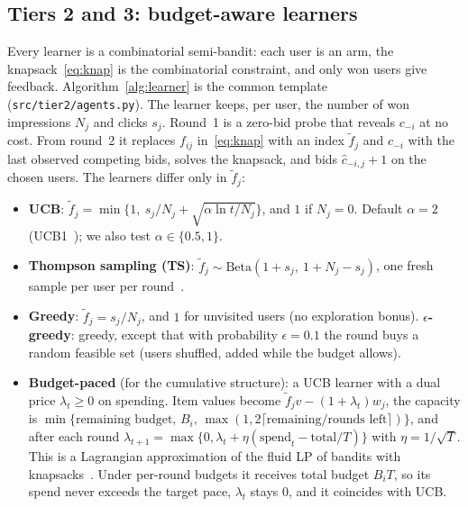 \documentclass{article}
\theoremstyle{definition}
\begin{document}
\subsection{Tiers 2 and 3: budget-aware learners}\label{sec:learners}
Every learner is a combinatorial semi-bandit: each user is an arm, the knapsack~\eqref{eq:knap} is the
combinatorial constraint, and only won users give feedback. Algorithm~\ref{alg:learner} is the common
template (\texttt{src/tier2/agents.py}). The learner keeps, per user, the number of won impressions $N_j$
and clicks $s_j$. Round~1 is a zero-bid probe that reveals $c_{-i}$ at no cost. From round~2 it replaces
$f_{ij}$ in~\eqref{eq:knap} with an index $\tilde f_j$ and $c_{-i}$ with the last observed competing bids,
solves the knapsack, and bids $\hat c_{-i,j}+1$ on the chosen users. The learners differ only in
$\tilde f_j$:
\begin{itemize}
  \item \textbf{UCB}: $\tilde f_j=\min\{1,\ s_j/N_j+\sqrt{\alpha\ln t/N_j}\}$, and $1$ if $N_j=0$. Default
        $\alpha=2$ (UCB1~\citep{auer2002finite}); we also test $\alpha\in\{0.5,1\}$.
  \item \textbf{Thompson sampling (TS)}: $\tilde f_j\sim\mathrm{Beta}(1+s_j,\ 1+N_j-s_j)$, one fresh
        sample per user per round~\citep{thompson1933likelihood,agrawal2012analysis}.
  \item \textbf{Greedy}: $\tilde f_j=s_j/N_j$, and $1$ for unvisited users (no exploration bonus).
        \textbf{$\epsilon$-greedy}: greedy, except that with probability $\epsilon=0.1$ the round buys a
        random feasible set (users shuffled, added while the budget allows).
  \item \textbf{Budget-paced} (for the cumulative structure): a UCB learner with a dual price
        $\lambda_t\ge0$ on spending. Item values become $\tilde f_jv-(1+\lambda_t)w_j$, the capacity is
        $\min\{\text{remaining budget},\,B_i,\,\max(1,2\lceil\text{remaining}/\text{rounds left}\rceil)\}$,
        and after each round $\lambda_{t+1}=\max\{0,\lambda_t+\eta(\text{spend}_t-\text{total}/T)\}$ with
        $\eta=1/\sqrt T$. This is a Lagrangian approximation of the fluid LP of bandits with
        knapsacks~\citep{badanidiyuru2013bandits,agrawal2014bandits}. Under per-round budgets it
        receives total budget $B_iT$, so its spend never exceeds the target pace, $\lambda_t$ stays $0$,
        and it coincides with UCB.
\end{itemize}
\end{document}
